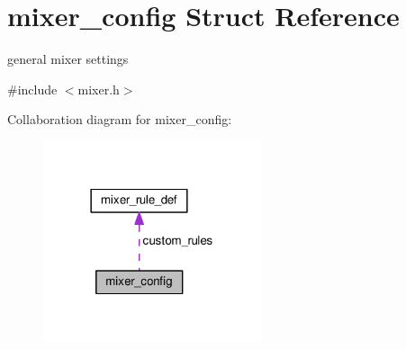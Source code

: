 \hypertarget{structmixer__config}{\section{mixer\+\_\+config Struct Reference}
\label{structmixer__config}
}


general mixer settings  




{\ttfamily \#include $<$mixer.\+h$>$}



Collaboration diagram for mixer\+\_\+config\+:\nopagebreak
\begin{figure}[H]
\begin{center}
\leavevmode
\includegraphics[width=182pt]{structmixer__config__coll__graph}
\end{center}
\end{figure}
